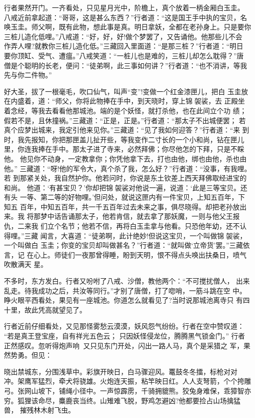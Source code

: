 行者果然开门。一齐看处，只见星月光中，阶檐上，真个放着一柄金厢白玉圭。
八戒近前拿起道：“哥哥，这是甚么东西？”行者道：“这是国王手中执的宝贝，名
唤玉圭。师父啊，既有此物，想此事是真。明日拿妖，全都在老孙身上。只是要你
三桩儿造化低哩。”八戒道：“好，好，好!做个梦罢了，又告诵他。他那些儿不会
作弄人哩?就教你三桩儿造化低。”三藏回入里面道：“是那三桩？”行者道：“明日
要你顶缸、受气、遭瘟。”八戒笑道：“一桩儿也是难的，三桩儿却怎么耽得？”唐
僧是个聪明的长老，便问：“徒弟啊，此三事如何讲？”行者道：“也不消讲，等我
先与你二件物。”

好大圣，拔了一根毫毛，吹口仙气，叫声“变”!变做一个红金漆匣儿，把白
玉圭放在内盛着，道：“师父，你将此物捧在手中，到天晓时，穿上锦袈裟，去
正殿坐着念经，等我去看看他那城池。端的是个妖怪，就打杀他，也在此间立个功
绩；假若不是，且休撞祸。”三藏道：“正是，正是。”行者道：“那太子不出城便罢；
若真个应梦出城来，我定引他来见你。”三藏道：“见了我如何迎答？”行者道：“来
到时，我先报知，你把那匣盖儿扯开些，等我变作二寸长的一个小和尚，钻在匣儿
里，你连我捧在手中。那太子进了寺来，必然拜佛；你尽他怎的下拜，只是不睬他。
他见你不动身，一定教拿你；你凭他拿下去，打也由他，绑也由他，杀也由他。”
三藏道：“呀!他的军令大，真个杀了我，怎么好？”行者道：“没事，有我哩。若
到那紧关处，我自然护你。他若问时，你说是东土钦差上西天拜佛取经进宝的和尚。
他道：‘有甚宝贝？’你却把锦袈裟对他说一遍，说道：‘此是三等宝贝。还有头
一等、第二等的好物哩。’但问处，就说这匣内有一件宝贝，上知五百年，下知五
百年，中知五百年，共一千五百年过去未来之事，俱尽晓得。却把老孙放出来。我
将那梦中话告诵那太子，他若肯信，就去拿了那妖魔，一则与他父王报仇，二来我
们立个名节；他若不信，再将白玉圭拿与他看。只恐他年幼，还不认得哩。”三藏
闻言，大喜道：“徒弟啊，此计绝妙!但说这宝贝，一个叫做锦袈裟，一个叫做白
玉圭；你变的宝贝却叫做甚名？”行者道：“就叫做‘立帝货’罢。”三藏依言，记
在心上。师徒们一夜那曾得睡，盼到天明，恨不得点头唤出扶桑日，喷气吹散满天
星。

不多时，东方发白。行者又吩咐了八戒、沙僧，教他两个：“不可搅扰僧人，
出来乱走。待我成功之后，共汝等同行。”才别了唐僧，打了唿哨，一筋斗跳在空
中。睁火眼平西看处，果见有一座城池。你道怎么就看见了?当时说那城池离寺只
有四十里，故此凭高就望见了。

行者近前仔细看处，又见那怪雾愁云漠漠，妖风怨气纷纷。行者在空中赞叹道：
“若是真王登宝座，自有祥光五色云；
只因妖怪侵龙位，腾腾黑气锁金门。”
行者正然感叹。忽听得炮声响，又只见东门开处，闪出一路人马，真个是采猎之
军，果然势勇。但见：

晓出禁城东，分围浅草中。彩旗开映日，白马骤迎风。鼍鼓冬冬擂，标枪对对
冲。架鹰军猛烈，牵犬将骁雄。火炮连天振，粘竿映日红。人人支弩箭，个个挎雕
弓。张网山坡下，铺绳小径中。一声惊霹雳，千骑拥貔熊。狡兔身难保，乖獐智亦
穷。狐狸该命尽，麋鹿丧当终。山雉难飞脱，野鸡怎避凶?他都要捡占山场擒猛兽，
摧残林木射飞虫。

